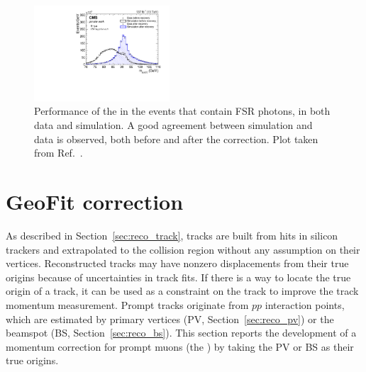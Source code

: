 \begin{figure}[!htb]
      \centering
      \captionsetup{justification=justified}
      \includegraphics[width=0.45\textwidth]{pics/muon_corr/FSR/FSRrecovery_Validation.pdf}
      \caption{Performance of the \FSR in the \zmm events that contain FSR photons, in both data and simulation. 
               A good agreement between simulation and data is observed, both before and after the correction.
               Plot taken from Ref.~\cite{oliverthesis}.}
      \label{fig:fsr_val}
\end{figure}


\section{GeoFit correction} \label{sec:GeoFit}

As described in Section~\ref{sec:reco_track},
tracks are built from hits in silicon trackers and extrapolated to the collision region
without any assumption on their vertices.
Reconstructed tracks may have nonzero displacements from their true origins because of uncertainties in track fits.
If there is a way to locate the true origin of a track, 
it can be used as a constraint on the track to improve the track momentum measurement.
Prompt tracks originate from $pp$ interaction points, 
which are estimated by primary vertices (PV, Section~\ref{sec:reco_pv}) or the beamspot (BS, Section~\ref{sec:reco_bs}).
This section reports the development of a momentum correction for prompt muons (the \GeoFit)
by taking the PV or BS as their true origins.


